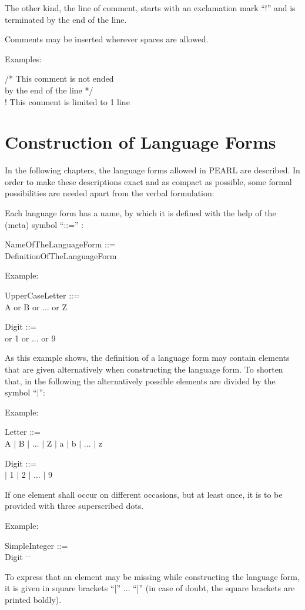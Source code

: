 The other kind, the line of comment, starts with an exclamation
mark ``!'' and is terminated by the end of the line.

Comments may be inserted wherever spaces are allowed.

Examples:

/* This comment is not ended\\
\x by the end of the line */\\
! This comment is limited to 1 line

\section{Construction of Language Forms}  %

In the following chapters, the language forms allowed in PEARL are
described.  In order to make these descriptions exact and as compact as
possible, some formal possibilities are needed apart from the verbal
formulation:

Each language form has a name, by which it is defined with the help of
the (meta) symbol ``::='' :

NameOfTheLanguageForm ::=\\
\x DefinitionOfTheLanguageForm

Example:

UpperCaseLetter ::=\\
\x A or B or ... or Z

Digit ::=\\
 or 1 or ... or 9

As this example shows, the definition of a language form may contain
elements that are given alternatively when constructing the language
form. To shorten that, in the following the alternatively possible
elements are divided by the symbol ``$\mid$'':

Example:

Letter ::=\\
\x A $\mid$ B $\mid$ ... $\mid$ Z $\mid$ a $\mid$ b $\mid$ ... $\mid$ z

Digit ::=\\
 $\mid$ 1 $\mid$ 2 $\mid$ ... $\mid$ 9

If one element shall occur on different occasions, but at least once, it
is to be provided with three superscribed dots.

Example:

SimpleInteger ::=\\
\x Digit $^{...}$

To express that an element may be missing while constructing the
language form, it is given in square brackets ``['' ... ``]'' (in case
of doubt, the square brackets are printed boldly).

